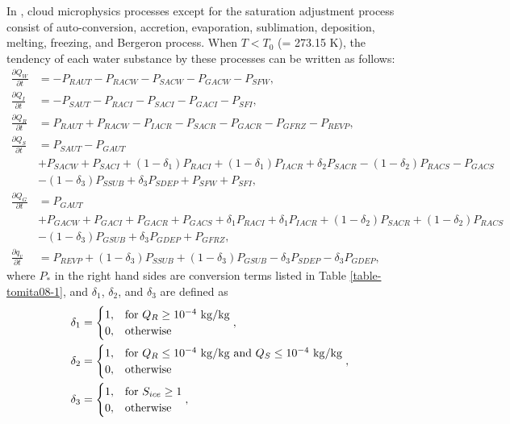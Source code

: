 In \citet{tomita_2008}, cloud microphysics processes except for the saturation adjustment process consist of auto-conversion, accretion, evaporation, sublimation, deposition, melting, freezing, and Bergeron process. When $T < T_{0}$ (= 273.15 K), the tendency of each water substance by these processes can be written as follows:
\begin{align}
  \frac{\partial Q_{W}}{\partial t} &= -P_{RAUT}-P_{RACW}-P_{SACW}-P_{GACW}-P_{SFW}, \\
  \frac{\partial Q_{I}}{\partial t} &= -P_{SAUT}-P_{RACI}-P_{SACI}-P_{GACI}-P_{SFI}, \\
  \frac{\partial Q_{R}}{\partial t} &= P_{RAUT}+P_{RACW}-P_{IACR}-P_{SACR}-P_{GACR}-P_{GFRZ}-P_{REVP}, \\
  \frac{\partial Q_{S}}{\partial t} &= P_{SAUT}-P_{GAUT} \nonumber \\
  &+P_{SACW}+P_{SACI}+(1-\delta_{1})P_{RACI}+(1-\delta_{1})P_{IACR}+\delta_{2}P_{SACR}-(1-\delta_{2})P_{RACS}-P_{GACS} \nonumber \\
  &-(1-\delta_{3})P_{SSUB}+\delta_{3}P_{SDEP}+P_{SFW}+P_{SFI}, \\
  \frac{\partial Q_{G}}{\partial t} &= P_{GAUT} \nonumber \\
  &+P_{GACW}+P_{GACI}+P_{GACR}+P_{GACS}+\delta_{1}P_{RACI}+\delta_{1}P_{IACR}+(1-\delta_{2})P_{SACR}+(1-\delta_{2})P_{RACS} \nonumber \\
  &-(1-\delta_{3})P_{GSUB}+\delta_{3}P_{GDEP}+P_{GFRZ}, \\
  \frac{\partial q_{v}}{\partial t} &= P_{REVP}+(1-\delta_{3})P_{SSUB}+(1-\delta_{3})P_{GSUB}-\delta_{3}P_{SDEP}-\delta_{3}P_{GDEP},
\end{align}
where $P_{*}$ in the right hand sides are conversion terms listed in Table \ref{table-tomita08-1}, and $\delta_{1}$, $\delta_{2}$, and $\delta_{3}$ are defined as
\begin{align}
\delta_{1} &=
\begin{cases}
  1, &{\rm for\ } Q_{R} \geq 10^{-4} {\rm \ kg/kg}\\
  0, &{\rm otherwise}\\
\end{cases},
\\
\delta_{2} &=
\begin{cases}
  1, &{\rm for\ } Q_{R} \leq 10^{-4} {\rm \ kg/kg\ and\ } Q_{S} \leq 10^{-4} {\rm \ kg/kg}\\
  0, &{\rm otherwise}\\
\end{cases},
\\
\delta_{3} &=
\begin{cases}
  1, &{\rm for\ } S_{ice} \geq 1\\
  0, &{\rm otherwise}\\
\end{cases},
\end{align}
